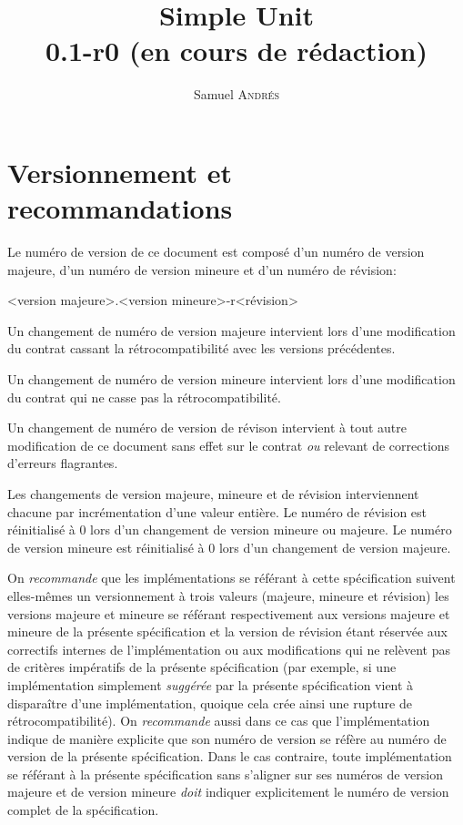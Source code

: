 \documentclass[a4paper,draft,twoside,10pt]{article}
\title{Simple Unit\\0.1-r0 (en cours de rédaction)}
\author{Samuel \textsc{Andrés}}
\begin{document}
\maketitle

\section{Versionnement et recommandations}

Le numéro de version de ce document est composé d'un numéro de version majeure, d'un numéro de version mineure et d'un
numéro de révision:

<version majeure>.<version mineure>-r<révision>

Un changement de numéro de version majeure intervient lors d'une modification du contrat cassant la rétrocompatibilité
avec les versions précédentes.

Un changement de numéro de version mineure intervient lors d'une modification du contrat qui ne casse pas la
rétrocompatibilité.

Un changement de numéro de version de révison intervient à tout autre modification de ce document sans effet sur le
contrat \emph{ou} relevant de corrections d'erreurs flagrantes.

Les changements de version majeure, mineure et de révision interviennent chacune par incrémentation d'une valeur
entière. Le numéro de révision est réinitialisé à 0 lors d'un changement de version mineure ou majeure. Le numéro de
version mineure est réinitialisé à 0 lors d'un changement de version majeure.

On \emph{recommande} que les implémentations se référant à cette spécification suivent elles-mêmes un versionnement à
trois valeurs (majeure, mineure et révision) les versions majeure et mineure se référant respectivement aux versions
majeure et mineure de la présente spécification et la version de révision étant réservée aux correctifs internes de
l'implémentation ou aux modifications qui ne relèvent pas de critères impératifs de la présente spécification (par
exemple, si une implémentation simplement \emph{suggérée} par la présente spécification vient à disparaître d'une
implémentation, quoique cela crée ainsi une rupture de rétrocompatibilité). On \emph{recommande} aussi dans ce cas que
l'implémentation indique de manière explicite que son numéro de version se réfère au numéro de version de la présente
spécification. Dans le cas contraire, toute implémentation se référant à la présente spécification sans s'aligner sur
ses numéros de version majeure et de version mineure \emph{doit} indiquer explicitement le numéro de version complet de
la spécification.
\end{document}
